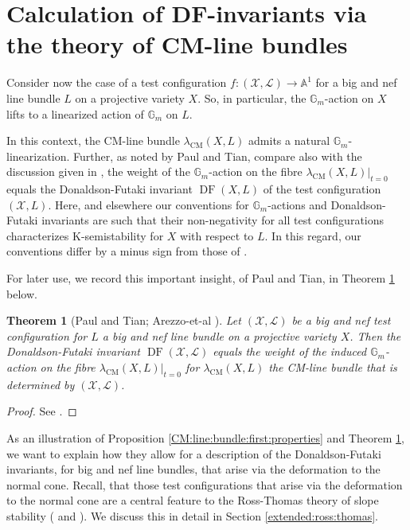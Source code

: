 \documentclass[12pt]{amsart}
\newcommand{\K}{\mathrm{K}}
\renewcommand{\AA}{\mathbb{A}} %
\newtheorem{theorem}{Theorem}[section]
\theoremstyle{definition}
\numberwithin{equation}{section}
\begin{document}
\section{Calculation of DF-invariants via the theory of CM-line bundles}

Consider now the case of a test configuration $f \colon (\mathcal{X}, \mathcal{L}) \rightarrow \AA^1$ for a big and nef line bundle $L$ on a projective variety $X$.  So, in particular, the $\mathbb{G}_m$-action on $X$ lifts to a linearized action of $\mathbb{G}_m$ on $L$.

In this context, the CM-line bundle $\lambda_{\mathrm{CM}}(X,L)$ admits a natural $\mathbb{G}_m$-linearization.  Further, as noted by Paul and Tian, compare also with the discussion given in \cite[Remark 2.3]{Arezzo:DellaVedova:LaNave}, the weight of the $\mathbb{G}_m$-action on the fibre  $\lambda_{\mathrm{CM}}(X,L)|_{t = 0}$ equals the Donaldson-Futaki invariant $\operatorname{DF}(X,L)$ of the test configuration $(\mathcal{X},L)$.  Here, and elsewhere our conventions for $\mathbb{G}_m$-actions and Donaldson-Futaki invariants are such that their non-negativity for all test configurations characterizes $\K$-semistability for $X$ with respect to $L$.  In this regard, our conventions differ by a minus sign from those of \cite{Arezzo:DellaVedova:LaNave}.

For later use, we record this important insight, of Paul and Tian, in Theorem \ref{Paul:Tian:DF:Thm} below.

\begin{theorem}[Paul and Tian; Arezzo-et-al {\cite[Proposition 3.3]{Arezzo:DellaVedova:LaNave}}]\label{Paul:Tian:DF:Thm}
Let $(\mathcal{X},\mathcal{L})$ be a big and nef test configuration for $L$ a big and nef line bundle on a projective variety $X$.  Then the Donaldson-Futaki invariant $\operatorname{DF}(\mathcal{X},\mathcal{L})$ equals the weight of the induced $\mathbb{G}_m$-action on the fibre $\lambda_{\mathrm{CM}}(X,L)|_{t = 0}$ for $\lambda_{\mathrm{CM}}(X,L)$ the CM-line bundle that is determined by $(\mathcal{X},\mathcal{L})$.
\end{theorem}

\begin{proof}
See \cite[Proposition 3.3]{Arezzo:DellaVedova:LaNave}.
\end{proof}


As an illustration of Proposition \ref{CM:line:bundle:first:properties}  and Theorem \ref{Paul:Tian:DF:Thm}, we want to explain how they allow for a description of the Donaldson-Futaki invariants, for big and nef line bundles, that arise via the deformation to the normal cone.  Recall, that those test configurations that arise via the deformation to the normal cone are a central feature to the Ross-Thomas theory of slope stability (\cite{Ross:Thomas:2007} and \cite{Ross:Thomas:2006}).  We discuss this in detail in Section \ref{extended:ross:thomas}.
\end{document}
